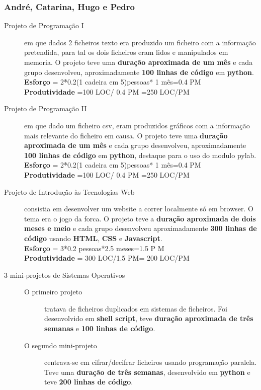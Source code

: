 \documentclass[a4paper]{report}
\begin{document}
\subsubsection*{André, Catarina, Hugo e Pedro} 
\begin{description}
\item[Projeto de Programação I] em que dados 2 ficheiros texto era produzido um ficheiro com a informação pretendida, para tal os dois ficheiros eram lidos e manipulados em memoria. O projeto teve uma \textbf{duração aproximada de um mês} e cada grupo desenvolveu, aproximadamente \textbf{100 linhas de código} em \textbf{python}.\\\textbf{Esforço} = 2*0.2(1 cadeira em 5)pessoas* 1 mês=0.4 PM\\ \textbf{Produtividade} =100 LOC/ 0.4 PM =250 LOC/PM

\item[Projeto de Programação II] em que dado um ficheiro csv, eram produzidos gráficos com a informação mais relevante do ficheiro em causa. O projeto teve uma \textbf{duração aproximada de um mês} e cada grupo desenvolveu, aproximadamente \textbf{100 linhas de código} em \textbf{python}, destaque para o uso do modulo pylab.\\\textbf{Esforço} = 2*0.2(1 cadeira em 5)pessoas* 1 mês=0.4 PM\\ \textbf{Produtividade} =100 LOC/ 0.4 PM =250 LOC/PM

\item [Projeto de Introdução às Tecnologias Web] consistia em desenvolver um website a correr localmente só em browser. O tema era o jogo da forca. O projeto teve a \textbf{duração aproximada de dois meses e meio} e cada grupo desenvolveu aproximadamente \textbf{300 linhas de código} usando \textbf{HTML}, \textbf{CSS} e \textbf{Javascript}.\\\textbf{Esforço} = 3*0.2 pessoas*2.5 meses=1.5 P M\\ \textbf{Produtividade} = 300 LOC/1.5 PM= 200 LOC/PM

\item[3 mini-projetos de Sistemas Operativos]\mbox{}
	\begin{description}
		\item[O primeiro projeto] tratava de ficheiros duplicados em sistemas de ficheiros. Foi desenvolvido em \textbf{shell script}, teve \textbf{duração aproximada de três semanas} e \textbf{100 linhas de código}.		
		\item [O segundo mini-projeto] centrava-se em cifrar/decifrar ficheiros usando programação paralela. Teve uma \textbf{duração de três semanas}, desenvolvido em \textbf{python} e teve \textbf{200 linhas de código}.
		

\end{description}
\end{description}
\end{document}
